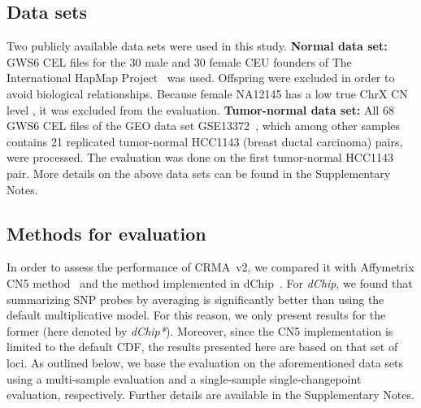 \documentclass{bioinfo}
\newcommand{\GWSSix}{GWS6\xspace}
\newcommand{\chrX}{ChrX\xspace}
\begin{document}
\subsection{Data sets}
Two publicly available data sets were used in this study.
\textbf{Normal data set:} 
\GWSSix CEL files for the 30 male and 30 female CEU founders of The International HapMap Project~\citep{HapMap_2003, AltshulerD_etal_2005} was used. Offspring were excluded in order to avoid biological relationships.
Because female NA12145 has a low true \chrX CN level \citep{TingJ_etal_2006}, it was excluded from the evaluation.  
\textbf{Tumor-normal data set:} 
All 68 \GWSSix CEL files of the GEO data set GSE13372~\citep{ChiangD_etal_2009}, which among other samples contains 21 replicated tumor-normal HCC1143 (breast ductal carcinoma) pairs, were processed.  The evaluation was done on the first tumor-normal HCC1143 pair.
More details on the above data sets can be found in the Supplementary Notes.


\subsection{Methods for evaluation}
\label{secEvaluation}
In order to assess the performance of CRMA~v2, we compared it with Affymetrix CN5 method~\citep{Affymetrix_2008m} and the method implemented in dChip~\citep{LiWong_2001}.  For \emph{dChip}, we found that summarizing SNP probes by averaging is significantly better than using the default multiplicative model.  For this reason, we only present results for the former (here denoted by \emph{dChip*}).
Moreover, since the CN5 implementation is limited to the default CDF, the results presented here are based on that set of loci.
As outlined below, we base the evaluation on the aforementioned data sets using a multi-sample evaluation and a single-sample single-changepoint evaluation, respectively.  Further details are available in the Supplementary Notes.
\end{document}
